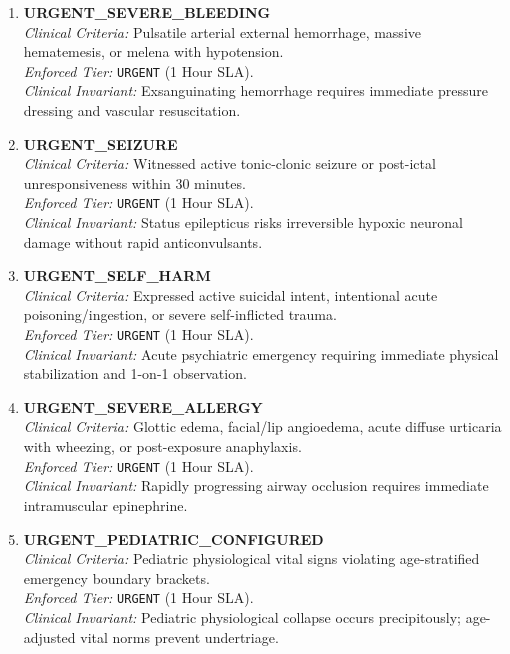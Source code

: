 \documentclass[11pt,a4paper,oneside]{report}
\begin{document}
\begin{enumerate}[leftmargin=20pt]
  \item \textbf{URGENT\_SEVERE\_BLEEDING}\\
  \textit{Clinical Criteria:} Pulsatile arterial external hemorrhage, massive hematemesis, or melena with hypotension.\\
  \textit{Enforced Tier:} \texttt{URGENT} (1 Hour SLA).\\
  \textit{Clinical Invariant:} Exsanguinating hemorrhage requires immediate pressure dressing and vascular resuscitation.

  \item \textbf{URGENT\_SEIZURE}\\
  \textit{Clinical Criteria:} Witnessed active tonic-clonic seizure or post-ictal unresponsiveness within 30 minutes.\\
  \textit{Enforced Tier:} \texttt{URGENT} (1 Hour SLA).\\
  \textit{Clinical Invariant:} Status epilepticus risks irreversible hypoxic neuronal damage without rapid anticonvulsants.

  \item \textbf{URGENT\_SELF\_HARM}\\
  \textit{Clinical Criteria:} Expressed active suicidal intent, intentional acute poisoning/ingestion, or severe self-inflicted trauma.\\
  \textit{Enforced Tier:} \texttt{URGENT} (1 Hour SLA).\\
  \textit{Clinical Invariant:} Acute psychiatric emergency requiring immediate physical stabilization and 1-on-1 observation.

  \item \textbf{URGENT\_SEVERE\_ALLERGY}\\
  \textit{Clinical Criteria:} Glottic edema, facial/lip angioedema, acute diffuse urticaria with wheezing, or post-exposure anaphylaxis.\\
  \textit{Enforced Tier:} \texttt{URGENT} (1 Hour SLA).\\
  \textit{Clinical Invariant:} Rapidly progressing airway occlusion requires immediate intramuscular epinephrine.

  \item \textbf{URGENT\_PEDIATRIC\_CONFIGURED}\\
  \textit{Clinical Criteria:} Pediatric physiological vital signs violating age-stratified emergency boundary brackets.\\
  \textit{Enforced Tier:} \texttt{URGENT} (1 Hour SLA).\\
  \textit{Clinical Invariant:} Pediatric physiological collapse occurs precipitously; age-adjusted vital norms prevent undertriage.


\end{enumerate}
\end{document}
